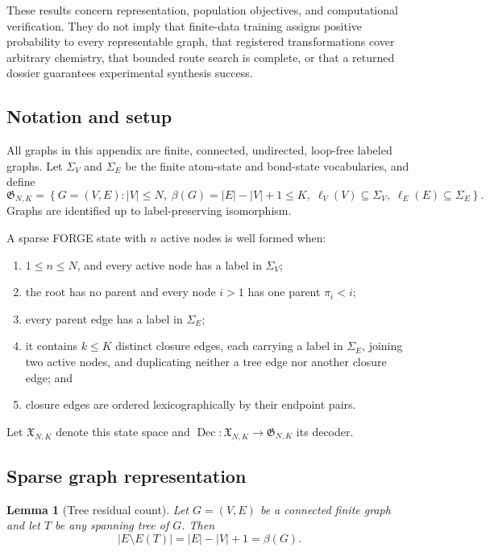 \documentclass{article}
\newtheorem{lemma}[theorem]{Lemma}
\begin{document}
These results concern representation, population objectives, and computational verification.
They do not imply that finite-data training assigns positive probability to every representable
graph, that registered transformations cover arbitrary chemistry, that bounded route search is
complete, or that a returned dossier guarantees experimental synthesis success.

\subsection{Notation and setup}

All graphs in this appendix are finite, connected, undirected, loop-free labeled graphs.
Let $\Sigma_V$ and $\Sigma_E$ be the finite atom-state and bond-state vocabularies, and define
\begin{equation}
    \mathfrak{G}_{N,K}
    =
    \left\{
        G=(V,E):
        |V|\leq N,\;
        \beta(G)=|E|-|V|+1\leq K,\;
        \ell_V(V)\subseteq\Sigma_V,\;
        \ell_E(E)\subseteq\Sigma_E
    \right\}.
\end{equation}
Graphs are identified up to label-preserving isomorphism.

A sparse FORGE state with $n$ active nodes is well formed when:
\begin{enumerate}
    \item $1\leq n\leq N$, and every active node has a label in $\Sigma_V$;
    \item the root has no parent and every node $i>1$ has one parent $\pi_i<i$;
    \item every parent edge has a label in $\Sigma_E$;
    \item it contains $k\leq K$ distinct closure edges, each carrying a label in $\Sigma_E$, joining
    two active nodes, and duplicating neither a tree edge nor another closure edge; and
    \item closure edges are ordered lexicographically by their endpoint pairs.
\end{enumerate}
Let $\mathfrak{X}_{N,K}$ denote this state space and
$\operatorname{Dec}:\mathfrak{X}_{N,K}\rightarrow\mathfrak{G}_{N,K}$ its decoder.

\subsection{Sparse graph representation}

\begin{lemma}[Tree residual count]
\label{lem:tree-closure}
Let $G=(V,E)$ be a connected finite graph and let $T$ be any spanning tree of $G$.
Then
\begin{equation}
    |E\setminus E(T)|
    =
    |E|-|V|+1
    =
    \beta(G).
\end{equation}
\end{lemma}
\end{document}
